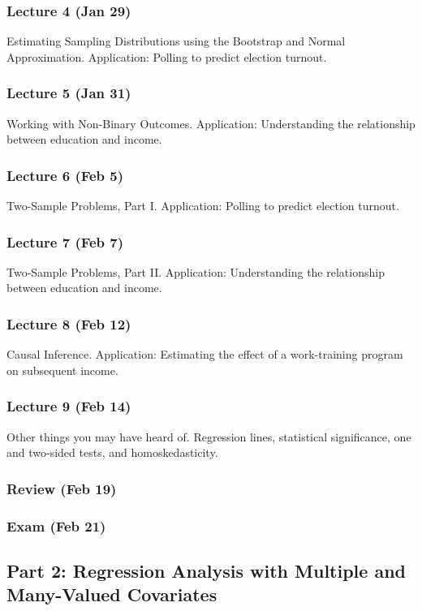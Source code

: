 \documentclass[12pt]{article}
\begin{document}
\subsubsection*{Lecture 4 (Jan 29)}
Estimating Sampling Distributions using the Bootstrap and Normal Approximation. Application: Polling to predict election turnout.

\subsubsection*{Lecture 5 (Jan 31)}
Working with Non-Binary Outcomes. Application: Understanding the relationship between education and income.

\subsubsection*{Lecture 6 (Feb 5)}
Two-Sample Problems, Part I. Application: Polling to predict election turnout.

\subsubsection*{Lecture 7 (Feb 7)}
Two-Sample Problems, Part II. Application: Understanding the relationship between education and income.

\subsubsection*{Lecture 8 (Feb 12)}
Causal Inference. Application: Estimating the effect of a work-training program on subsequent income.

\subsubsection*{Lecture 9 (Feb 14)}
Other things you may have heard of. Regression lines, statistical significance, one and two-sided tests, and homoskedasticity.

\subsubsection*{Review (Feb 19)}
\subsubsection*{Exam (Feb 21)}

\subsection*{Part 2: Regression Analysis with Multiple and Many-Valued Covariates}
\end{document}
